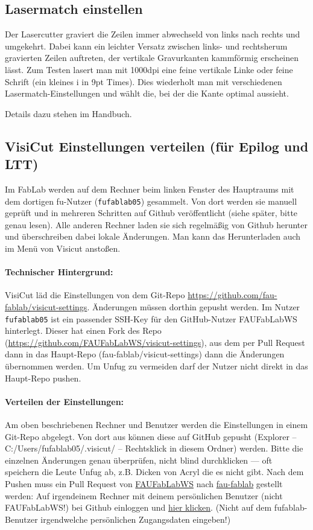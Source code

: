 \documentclass{\basedir/fablab-document}
\begin{document}
	\subsection{Lasermatch einstellen}
	Der Lasercutter graviert die Zeilen immer abwechseld von links nach rechts und umgekehrt. Dabei kann ein leichter Versatz zwischen links- und rechtsherum gravierten Zeilen auftreten, der vertikale Gravurkanten kammförmig erscheinen lässt. Zum Testen lasert man mit 1000dpi eine feine vertikale Linke oder feine Schrift (ein kleines i in 9pt Times). Dies wiederholt man mit verschiedenen Lasermatch-Einstellungen und wählt die, bei der die Kante optimal aussieht.

	Details dazu stehen im Handbuch.

	\subsection{VisiCut Einstellungen verteilen (für Epilog und LTT)}
	\label{sec:wartung-epilog:visicut}
	Im FabLab werden auf dem Rechner beim linken Fenster des Hauptraums mit dem dortigen fu-Nutzer (\texttt{fufablab05}) gesammelt. Von dort werden sie manuell geprüft und in mehreren Schritten auf Github veröffentlicht (siehe später, bitte genau lesen). Alle anderen Rechner laden sie sich regelmäßig von Github herunter und überschreiben dabei lokale Änderungen. Man kann das Herunterladen auch im Menü von Visicut anstoßen.
	
	\paragraph{Technischer Hintergrund:}
	VisiCut läd die Einstellungen von dem Git-Repo \url{https://github.com/fau-fablab/visicut-settings}.
	Änderungen müssen dorthin gepusht werden. 
	Im Nutzer \texttt{fufablab05} ist ein passender SSH-Key für den GitHub-Nutzer FAUFabLabWS hinterlegt. Dieser hat einen Fork des Repo (\url{https://github.com/FAUFabLabWS/visicut-settings}), aus dem per Pull Request dann in das Haupt-Repo (fau-fablab/visicut-settings) dann die Änderungen übernommen werden. Um Unfug zu vermeiden darf der Nutzer nicht direkt in das Haupt-Repo pushen.
	
	\paragraph{Verteilen der Einstellungen:}
	Am oben beschriebenen Rechner und Benutzer werden die Einstellungen in einem Git-Repo abgelegt.
	Von dort aus können diese auf GitHub gepusht (Explorer -- C:/Users/fufablab05/.visicut/ -- Rechtsklick in diesem Ordner) werden. Bitte die einzelnen Änderungen genau überprüfen, nicht blind durchklicken --- oft speichern die Leute Unfug ab, z.B. Dicken von Acryl die es nicht gibt. Nach dem Pushen muss ein Pull Request von \href{https://github.com/FAUFabLabWS/visicut-settings}{FAUFabLabWS} nach \href{https://github.com/fau-fablab/visicut-settings}{fau-fablab} gestellt werden: Auf irgendeinem Rechner mit deinem persönlichen Benutzer (nicht FAUFabLabWS!) bei Github einloggen und \href{https://github.com/fau-fablab/visicut-settings/compare/master...FAUFabLabWS:master}{hier klicken}. (Nicht auf dem fufablab-Benutzer irgendwelche persönlichen Zugangsdaten eingeben!)
\end{document}
